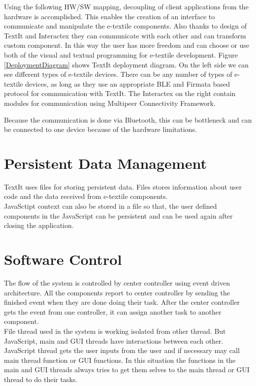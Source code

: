 Using the following HW/SW mapping, decoupling of client applications from the hardware is accomplished. This enables the creation of an interface to communicate and manipulate the e-textile components. Also thanks to design of TextIt and Interactex they can communicate with each other and can transform custom component. In this way the user has more freedom and can choose or use both of the visual and textual programming for e-textile development. Figure \ref{DeploymentDiagram} shows TextIt deployment diagram. On the left side we can see different types of e-textile devices. There can be any number of types of e-textile devices, as long as they use an appropriate BLE and Firmata based protocol for communication with TextIt. The Interactex on the right contain modules for communication using Multipeer Connectivity Framework. \\


Because the communication is done via Bluetooth, this can be bottleneck and can be connected to one device because of the hardware limitations. 

\section{Persistent Data Management}
	TextIt uses files for storing persistent data. Files stores information about user code and the data received from e-textile components. \\
	JavaSctipt context can also be stored in a file so that, the user defined components in the JavaScript can be persistent and can be used again after closing the application. 
	
\section{Software Control}
The flow of the system is controlled by center controller using event driven architecture. All the components report to center controller by sending the finished event when they are done doing their task. After the center controller gets the event from one controller, it can assign another task to another component. \\

File thread used in the system is working isolated from other thread. But JavaScript, main and GUI threads have interactions between each other. JavaScript thread gets the user inputs from the user and if necessary may call main thread function or GUI functions. In this situation the functions in the main and GUI threads always tries to get them selves to the main thread or GUI thread to do their tasks. 

